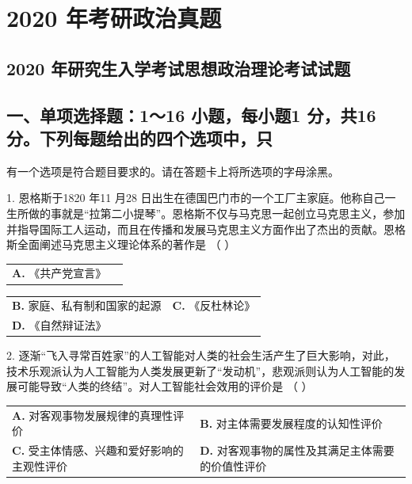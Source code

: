 \documentclass[UTF8,11pt]{ctexart}
\begin{document}
\section*{2020 年考研政治真题}
\subsection*{2020 年研究生入学考试思想政治理论考试试题}

\subsection*{一、单项选择题：1～16 小题，每小题1 分，共16 分。下列每题给出的四个选项中，只}

有一个选项是符合题目要求的。请在答题卡上将所选项的字母涂黑。


1. 恩格斯于1820 年11 月28 日出生在德国巴门市的一个工厂主家庭。他称自己一生所做的事就是“拉第二小提琴”。恩格斯不仅与马克思一起创立马克思主义，参加并指导国际工人运动，而且在传播和发展马克思主义方面作出了杰出的贡献。恩格斯全面阐述马克思主义理论体系的著作是 （    ）


\begin{center}\begin{tabular}{>{\raggedright\arraybackslash}p{\dimexpr(\linewidth-4\tabcolsep)/2\relax}>{\raggedright\arraybackslash}p{\dimexpr(\linewidth-4\tabcolsep)/2\relax}}
\textbf{A.} 《共产党宣言》 & \\[.35em]\end{tabular}\end{center}

\begin{center}\begin{tabular}{>{\raggedright\arraybackslash}p{\dimexpr(\linewidth-4\tabcolsep)/2\relax}>{\raggedright\arraybackslash}p{\dimexpr(\linewidth-4\tabcolsep)/2\relax}}
\textbf{B.} 家庭、私有制和国家的起源 & \textbf{C.} 《反杜林论》\\[.35em]
\textbf{D.} 《自然辩证法》 & \\[.35em]\end{tabular}\end{center}

2. 逐渐“飞入寻常百姓家”的人工智能对人类的社会生活产生了巨大影响，对此，技术乐观派认为人工智能为人类发展更新了“发动机”，悲观派则认为人工智能的发展可能导致“人类的终结”。对人工智能社会效用的评价是 （    ）


\begin{center}\begin{tabular}{>{\raggedright\arraybackslash}p{\dimexpr(\linewidth-4\tabcolsep)/2\relax}>{\raggedright\arraybackslash}p{\dimexpr(\linewidth-4\tabcolsep)/2\relax}}
\textbf{A.} 对客观事物发展规律的真理性评价 & \textbf{B.} 对主体需要发展程度的认知性评价\\[.35em]
\textbf{C.} 受主体情感、兴趣和爱好影响的主观性评价 & \textbf{D.} 对客观事物的属性及其满足主体需要的价值性评价\\[.35em]\end{tabular}\end{center}
\end{document}
